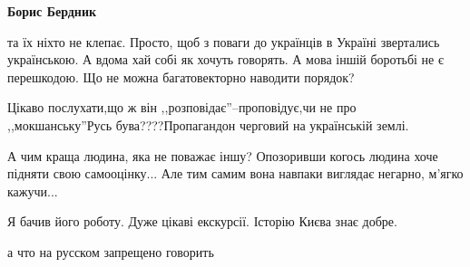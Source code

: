 \begin{itemize}
\begin{itemize}
 

\textbf{Борис Бердник} 

та їх ніхто не клепає. Просто, щоб з поваги до українців в Україні звертались
українською. А вдома хай собі як хочуть говорять. А мова іншій боротьбі не є
перешкодою. Що не можна багатовекторно наводити порядок?
\end{itemize}

 
Цікаво послухати,що ж він ,,розповідає''--проповідує,чи не про ,,мокшанську''Русь бува????Пропагандон черговий на українській землі.

 
А чим краща людина, яка не поважає іншу? Опозоривши когось людина хоче підняти
свою самооцінку... Але тим самим вона навпаки виглядає негарно, м'ягко
кажучи...

 
Я бачив його роботу. Дуже цікаві екскурсії. Історію Києва знає добре.

 
а что на русском запрещено говорить

\begin{itemize}

 

\end{itemize}
\end{itemize}
